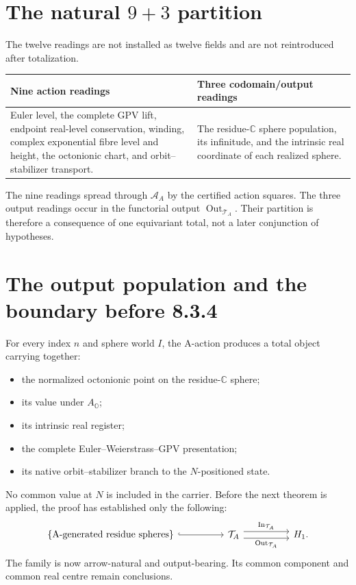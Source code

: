 \documentclass[11pt]{article}
\newcommand{\OO}{\mathbb O}
\newcommand{\CC}{\mathbb C}
\newcommand{\cA}{\mathscr A_A}
\newcommand{\TA}{\mathcal T_A}
\newcommand{\In}{\operatorname{In}}
\newcommand{\Out}{\operatorname{Out}}
\begin{document}
\section{The natural $9+3$ partition}

The twelve readings are not installed as twelve fields and are not
reintroduced after totalization.

\begin{center}
\begin{tabular}{p{}p{}}
\toprule
\textbf{Nine action readings} & \textbf{Three codomain/output readings} \\
\midrule
Euler level, the complete GPV lift, endpoint real-level conservation,
winding, complex exponential fibre level and height, the octonionic chart,
and orbit--stabilizer transport.
&
The residue-$\CC$ sphere population, its infinitude, and the intrinsic real
coordinate of each realized sphere. \\
\bottomrule
\end{tabular}
\end{center}

The nine readings spread through $\cA$ by the certified action squares.  The
three output readings occur in the functorial output $\Out_{\TA}$.  Their
partition is therefore a consequence of one equivariant total, not a later
conjunction of hypotheses.

\section{The output population and the boundary before 8.3.4}

For every index $n$ and sphere world $I$, the A-action produces a total
object carrying together:
\begin{itemize}[leftmargin=2em]
  \item the normalized octonionic point on the residue-$\CC$ sphere;
  \item its value under $A_{\OO}$;
  \item its intrinsic real register;
  \item the complete Euler--Weierstrass--GPV presentation;
  \item its native orbit--stabilizer branch to the $N$-positioned state.
\end{itemize}

No common value at $N$ is included in the carrier.  Before the next theorem
is applied, the proof has established only the following:
\[
\begin{tikzcd}[column sep=huge]
  \{\text{A-generated residue spheres}\}
    \arrow[r,hook]
  & \TA
    \arrow[r,shift left=0.8ex,"\In_{\TA}"]
    \arrow[r,shift right=0.8ex,"\Out_{\TA}"']
  & H_1 .
\end{tikzcd}
\]
The family is now arrow-natural and output-bearing.  Its common component
and common real centre remain conclusions.
\end{document}
